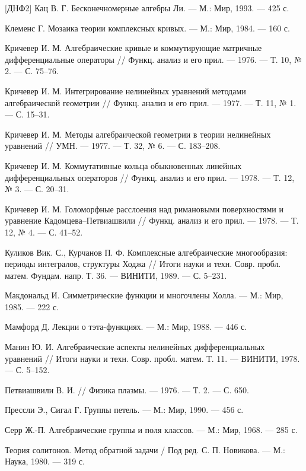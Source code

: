 \documentclass{article}
\theoremstyle{definition}
\theoremstyle{definition} %
\theoremstyle{remark}     %
\theoremstyle{definition}
\theoremstyle{definition}
\theoremstyle{definition}
\theoremstyle{definition}
\theoremstyle{definition}
\theoremstyle{definition}
\theoremstyle{definition}
\theoremstyle{definition}
\begin{document}
\begin{thebibliography}{[ДНФ2]}
 Кац В. Г. Бесконечномерные алгебры Ли. --- М.: Мир, 1993. --- 425 с.

 Клеменс Г. Мозаика теории комплексных кривых. --- М.: Мир, 1984. --- 160 с.

 Кричевер И. М. Алгебраические кривые и коммутирующие матричные дифференциальные операторы // Функц. анализ и его прил. --- 1976. --- Т. 10, № 2. --- С. 75--76.

 Кричевер И. М. Интегрирование нелинейных уравнений методами алгебраической геометрии // Функц. анализ и его прил. --- 1977. --- Т. 11, № 1. --- С. 15--31.

 Кричевер И. М. Методы алгебраической геометрии в теории нелинейных уравнений // УМН. --- 1977. --- Т. 32, № 6. --- С. 183--208.

 Кричевер И. М. Коммутативные кольца обыкновенных линейных дифференциальных операторов // Функц. анализ и его прил. --- 1978. --- Т. 12, № 3. --- С. 20--31.

 Кричевер И. М. Голоморфные расслоения над римановыми поверхностями и уравнение Кадомцева--Петвиашвили // Функц. анализ и его прил. --- 1978. --- Т. 12, № 4. --- С. 41--52.

 Куликов Вик. С., Курчанов П. Ф. Комплексные алгебраические многообразия: периоды интегралов, структуры Ходжа // Итоги науки и техн. Совр. пробл. матем. Фундам. напр. Т. 36. --- ВИНИТИ, 1989. --- С. 5--231.

 Макдональд И. Симметрические функции и многочлены Холла. --- М.: Мир, 1985. --- 222 с.

 Мамфорд Д. Лекции о тэта-функциях. --- М.: Мир, 1988. --- 446 с.

 Манин Ю. И. Алгебраические аспекты нелинейных дифференциальных уравнений // Итоги науки и техн. Совр. пробл. матем. Т. 11. --- ВИНИТИ, 1978. --- С. 5--152.

 Петвиашвили В. И. // Физика плазмы. --- 1976. --- Т. 2. --- С. 650.

 Прессли Э., Сигал Г. Группы петель. --- М.: Мир, 1990. --- 456 с.

 Серр Ж.-П. Алгебраические группы и поля классов. --- М.: Мир, 1968. --- 285 с.

 Теория солитонов. Метод обратной задачи / Под ред. С. П. Новикова. --- М.: Наука, 1980. --- 319 с.


\end{thebibliography}
\end{document}

